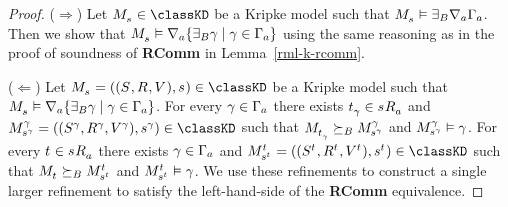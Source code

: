 \begin{proof}
($\Rightarrow$) Let $\kPModel{\kStateS} \in \classKD$ be a Kripke model such that $\kPModel{\kStateS} \entails \somerefsBs \coversA \Gamma_\agentA$.
Then we show that $\kPModel{\kStateS} \entails \coversA \{\somerefsBs \gamma \mid \gamma \in \Gamma_\agentA\}$ using the same reasoning as in the proof of soundness of {\bf RComm} in Lemma~\ref{rml-k-rcomm}.

($\Leftarrow$) Let $\kPModelAndTuple{\kStateS} \in \classKD$ be a Kripke model such that $\kPModel{\kStateS} \entails \coversA \{\somerefsBs \gamma \mid \gamma \in \Gamma_\agentA\}$.
For every $\gamma \in \Gamma_\agentA$ there exists $\kStateT_\gamma \in \kSuccessorsA{\kStateS}$ and $\kPModelAndTuple[\gamma]{\kStateS[\gamma]} \in \classKD$ such that $\kPModel{\kStateT_\gamma} \simulatesBs \kPModel[\gamma]{\kStateS[\gamma]}$ and $\kPModel[\gamma]{\kStateS[\gamma]} \entails \gamma$.
For every $\kStateT \in \kSuccessorsA{\kStateS}$ there exists $\gamma \in \Gamma_\agentA$ and $\kPModelAndTuple[\kStateT]{\kStateS[\kStateT]} \in \classKD$ such that $\kPModel{\kStateT} \simulatesBs \kPModel[\kStateT]{\kStateS[\kStateT]}$ and $\kPModel[\kStateT]{\kStateS[\kStateT]} \entails \gamma$.
We use these refinements to construct a single larger refinement to satisfy the left-hand-side of the {\bf RComm} equivalence.


\end{proof}
